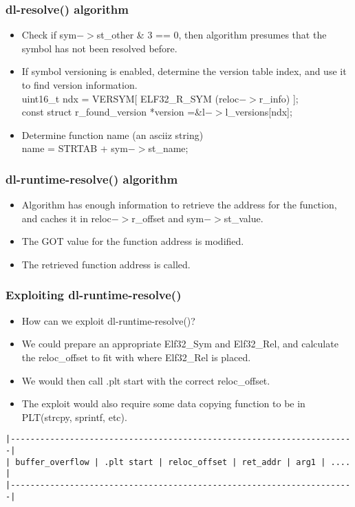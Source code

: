 \documentclass[10pt]{beamer}
\begin{document}
\begin{frame}[fragile]
\frametitle{dl-resolve() algorithm}
 \begin{itemize}
    \item Check if sym$->$st\_other \& 3 == 0, then algorithm presumes that the symbol has not been resolved before.

    \item If symbol versioning is enabled, determine the version table index, and use it to find version information.
    \\
    uint16\_t ndx = VERSYM[ ELF32\_R\_SYM (reloc$->$r\_info) ];
    \\
    const struct r\_found\_version *version =\&l$->$l\_versions[ndx];

    \item Determine function name (an asciiz string)
    \\
    name = STRTAB + sym$->$st\_name;
  \end{itemize}

\end{frame}

\begin{frame}[fragile]
\frametitle{dl-runtime-resolve() algorithm}
 \begin{itemize}
    \item Algorithm has enough information to retrieve the address for the function, and caches it in reloc$->$r\_offset and sym$->$st\_value.

    \item The GOT value for the function address is modified.

    \item The retrieved function address is called.
  \end{itemize}

\end{frame}

\begin{frame}[fragile]
\frametitle{Exploiting dl-runtime-resolve()}

\begin{itemize}
\item How can we exploit dl-runtime-resolve()?

\item We could prepare an appropriate Elf32\_Sym and Elf32\_Rel, and calculate the reloc\_offset to fit with where Elf32\_Rel is placed.

\item We would then call .plt start with the
correct reloc\_offset.
\item The exploit would also require some data copying function to be in PLT(strcpy, sprintf, etc).

\end{itemize}

\scriptsize
\begin{verbatim}
|----------------------------------------------------------------------|
| buffer_overflow | .plt start | reloc_offset | ret_addr | arg1 | .... |
|----------------------------------------------------------------------|
\end{verbatim}
\normalsize


\end{frame}
\end{document}
